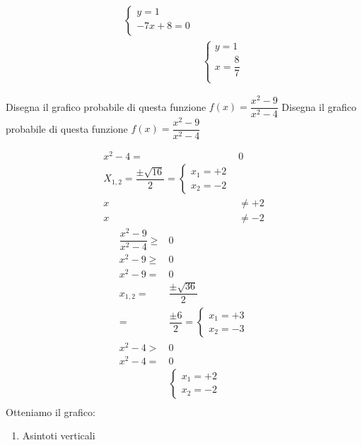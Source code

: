 \begin{exercise}
\begin{itemize}
\begin{enumerate}
\begin{align*}
\begin{cases}
	y=1\\
	-7x+8=0\\
	\end{cases}\\
	&\begin{cases}
	y=1\\
	x=\dfrac{8}{7}\\
	\end{cases}
\end{align*}
	\end{enumerate}
\end{itemize}
\begin{center}
	
\end{center}
\end{exercise}
\begin{exercise}
	Disegna il grafico probabile di questa funzione $f(x)= \dfrac{x^2-9}{x^2-4}$
	\tcblower
	Disegna il grafico probabile di questa funzione $f(x)= \dfrac{x^2-9}{x^2-4}$
	\begin{itemize}
	\begin{align*}
x^2-4=&0\\
X_{1,2}=\dfrac{\pm\sqrt{16}}{2}
=\begin{cases}
x_1=+2\\
x_2=-2
\end{cases}\\
x&\neq+2\\
x&\neq-2
\end{align*}
		\begin{align*}
	\dfrac{x^2-9}{x^2-4}\geq&0\\
	x^2-9\geq&0\\
	x^2-9=&0\\
	x_{1,2}=&\dfrac{\pm\sqrt{36}}{2}\\
	=&\dfrac{\pm 6}{2}
	=\begin{cases}
	x_1=+3\\
	x_2=-3
	\end{cases}\\
	x^2-4>&0\\
	x^2-4=&0\\
	&\begin{cases}
	x_1=+2\\
	x_2=-2
	\end{cases}\\
	\end{align*}
	Otteniamo il grafico:
	\begin{center}
		
	\end{center}
	\begin{enumerate}
		\item Asintoti verticali
		

\end{enumerate}
\end{itemize}
\end{exercise}
